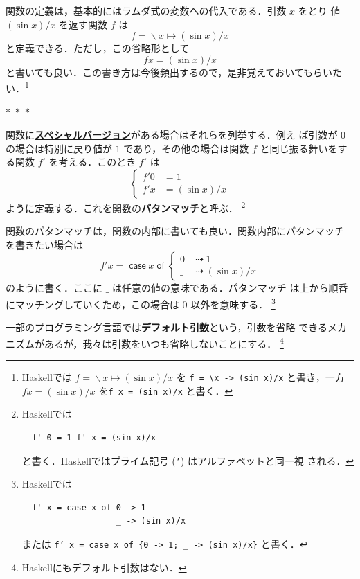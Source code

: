 \documentclass[a5paper,twoside,fleqn,draft]{jsbook}
\newcommand{\separator}{\begin{center}$*$~$*$~$*$\end{center}}
\newcommand{\programminglanguage}[1]{\textsf{#1}}
\newcommand{\haskell}{\programminglanguage{Haskell}}
\newcommand{\keyword}[1]{{\underline{\textbf{#1}}}}
\newcommand{\code}[1]{\texttt{#1}}
\newcommand{\mKeyword}[1]{\mathsf{#1}}
\newcommand{\mCaseKeyword}{\mKeyword{case}}
\newcommand{\mOfKeyword}{\mKeyword{of}}
\DeclareMathOperator{\mCaseKW}{\mCaseKeyword}
\DeclareMathOperator{\mOfKW}{\mOfKeyword}
\DeclareMathOperator{\mIfSo}{\dashrightarrow}
\DeclareMathOperator{\mLambda}{\backslash}
\DeclareMathOperator{\mLambdaArrow}{\mapsto}
\newcommand{\mCaseOf}[1]{\mCaseKW#1\mOfKW}
\begin{document}
関数の定義は，基本的にはラムダ式の変数への代入である．引数 $x$ をとり
値 $(\sin x)/x$ を返す関数 $f$ は
\begin{equation}
  f
  =\mLambda x\mLambdaArrow(\sin x)/x
\end{equation}
と定義できる．ただし，この省略形として
\begin{equation}
  fx
  =(\sin x)/x
\end{equation}
と書いても良い．この書き方は今後頻出するので，是非覚えておいてもらいた
い．\footnote{\haskell では $f=\mLambda x\mLambdaArrow(\sin x)/x$ を
  \code{f = \textbackslash x -> (sin x)/x} と書き，一方 $fx=(\sin
  x)/x$ を\code{f x = (sin x)/x} と書く．}

\separator

関数に\keyword{スペシャルバージョン}がある場合はそれらを列挙する．例え
ば引数が $0$ の場合は特別に戻り値が $1$ であり，その他の場合は関数 $f$
と同じ振る舞いをする関数 $f'$ を考える．このとき $f'$ は
\begin{equation}
  \left\{
  \begin{aligned}
    f'0&=1\\
    f'x&=(\sin x)/x
  \end{aligned}
  \right.
\end{equation}
ように定義する．これを関数の\keyword{パタンマッチ}と呼ぶ．
\footnote{\haskell では
\begin{verbatim}
  f' 0 = 1 f' x = (sin x)/x
\end{verbatim}
と書く．\haskell ではプライム記号 (\code{'}) はアルファベットと同一視
される．}

関数のパタンマッチは，関数の内部に書いても良い．関数内部にパタンマッチ
を書きたい場合は
\begin{equation}
  f'x=\mCaseOf{x}
  \begin{cases}
    0&\mIfSo1\\
    \_&\mIfSo(\sin x)/x
  \end{cases}
\end{equation}
のように書く．ここに $\_$ は任意の値の意味である．パタンマッチ
は上から順番にマッチングしていくため，この場合は $0$ 以外を意味する．
\footnote{\haskell では
\begin{verbatim}
  f' x = case x of 0 -> 1
                   _ -> (sin x)/x
\end{verbatim}
または \code{f' x = case x of \{0 -> 1; \_ -> (sin x)/x\}} と書く．}

一部のプログラミング言語では\keyword{デフォルト引数}という，引数を省略
できるメカニズムがあるが，我々は引数をいつも省略しないことにする．
\footnote{\haskell にもデフォルト引数はない．}
\end{document}
